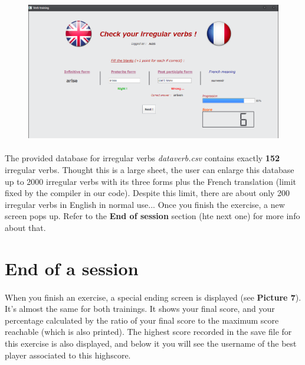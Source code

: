 \documentclass[12pt, a4paper]{report}
\begin{document}
\begin{figure}[H]
    \centering
    \includegraphics[scale=0.55]{images/verbs1.png}
\end{figure}

\paragraph{}The provided database for irregular verbs \textit{dataverb.csv} contains exactly \textbf{152} irregular verbs. Thought this is a large sheet, the user can enlarge this database up to 2000 irregular verbs with its three forms plus the French translation (limit fixed by the compiler in our code). Despite this limit, there are about only 200 irregular verbs in English in normal use... Once you finish the exercise, a new screen pops up. Refer to the \textbf{End of session} section (hte next one) for more info about that.

\newpage
\section*{\hspace{0.6cm}End of a session}

\paragraph{}When you finish an exercise, a special ending screen is displayed (see \textbf{Picture 7}). It's almost the same for both trainings. It shows your final score, and your percentage calculated by the ratio of your final score to the maximum score reachable (which is also printed). The highest score recorded in the save file for this exercise is also displayed, and below it you will see the username of the best player associated to this highscore.
\end{document}

